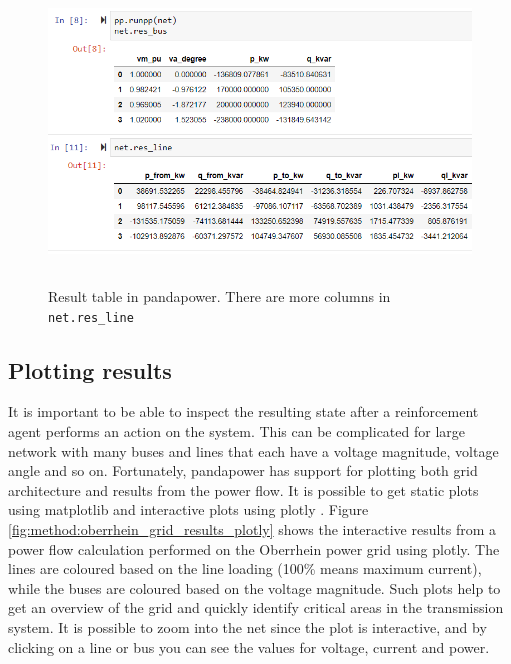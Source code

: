 \documentclass[class=book, crop=false]{standalone}
\begin{document}
\begin{figure}[H]
    \includegraphics[height=8cm, width=14cm]{figures/case4g_line_bus_res.PNG}
    \caption[size = 9]{Result table in pandapower. There are more columns in \texttt{net.res\_line}}
    \label{fig:method:res_line_bus_dataframe}
\end{figure}

\subsection{Plotting results}
It is important to be able to inspect the resulting state after a reinforcement agent performs an action on the system. This can be complicated for large network with many buses and lines that each have a voltage magnitude, voltage angle and so on. Fortunately, pandapower has support for plotting both grid architecture and results from the power flow. It is possible to get static plots using matplotlib and interactive plots using plotly \cite{plotly}. Figure \ref{fig:method:oberrhein_grid_results_plotly} shows the interactive results from a power flow calculation performed on the Oberrhein power grid using plotly. The lines are coloured based on the line loading (100\% means maximum current), while the buses are coloured based on the voltage magnitude. Such plots help to get an overview of the grid and quickly identify critical areas in the transmission system. It is possible to zoom into the net since the plot is interactive, and by clicking on a line or bus you can see the values for voltage, current and power.
\end{document}
